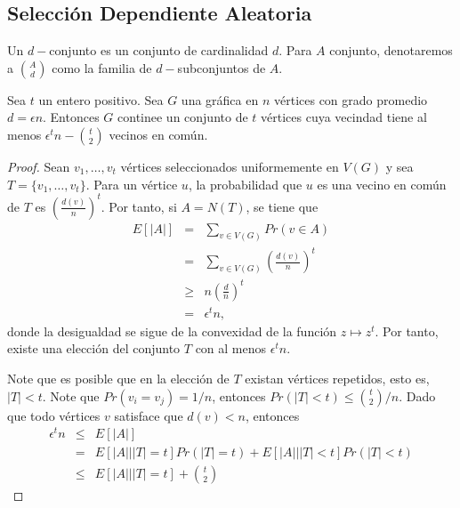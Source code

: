 \subsection{Selección Dependiente Aleatoria}

Un $d-$conjunto es un conjunto de cardinalidad $d$. Para $A$
conjunto, denotaremos a $\binom{A}{d}$ como la familia de
$d-$subconjuntos de $A$.

\begin{theorem}
Sea $t$ un entero positivo. Sea $G$ una gráfica en $n$ vértices con
grado promedio $d = \epsilon n$.
Entonces $G$ continee un conjunto de $t$ vértices cuya vecindad
tiene al menos $\epsilon^t n - \binom{t}{2}$ vecinos en común.
\end{theorem}
\begin{proof} %
Sean $v_1, \ldots, v_t$ vértices seleccionados uniformemente en
$V(G)$ y sea $T = \{v_1, \ldots, v_t\}$. Para un vértice $u$, la
probabilidad que $u$ es una vecino en común de $T$ es
$\left(\frac{d(v)}{n}\right)^t$.
Por tanto, si $A = N(T)$, se tiene que
\begin{eqnarray*}
  E[\vert A \vert] &=& \sum_{v \in V(G)} Pr(v \in A) \\
  &=& \sum_{v \in V(G)} \left(\frac{d(v)}{n} \right)^t \\
  &\ge& n \left(\frac{d}{n}\right)^t\\
  &=& \epsilon^t n,
\end{eqnarray*}
donde la desigualdad se sigue de la convexidad de la función $z \mapsto z^t$.
Por tanto, existe una elección del conjunto $T$ con al menos $\epsilon^t n $.

Note que es posible que en la elección de $T$ existan vértices
repetidos, esto es, $\vert T \vert < t$. Note que $Pr(v_i = v_j) =
1 / n$, entonces
$Pr(\vert T \vert < t) \le \binom{t}{2} / n$. Dado que todo
vértices $v$ satisface que
$d(v) < n$, entonces
\begin{eqnarray*}
  \epsilon^t n &\le& E[\vert A \vert] \\
  &=& E[\vert A \vert | \vert T \vert = t] Pr(\vert T \vert = t) +
  E[\vert A \vert | \vert T \vert < t] Pr(\vert T \vert < t)  \\
  &\le& E[\vert A \vert | \vert T \vert = t] + \binom{t}{2}
\end{eqnarray*}
\end{proof}

